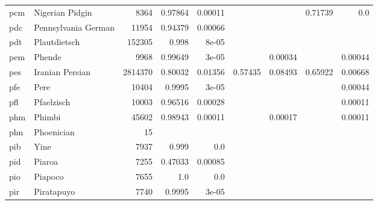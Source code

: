 \documentclass[11pt]{article}
\begin{document}
\begin{table*}[h]
{\begin{tabular}{llrrrrrrr}
pcm         & Nigerian Pidgin         & 8364         & 0.97864         & 0.00011         &          &          & 0.71739         & 0.0         \\

pdc         & Pennsylvania German         & 11954         & 0.94379         & 0.00066         &          &          &          &          \\

pdt         & Plautdietsch         & 152305         & 0.998         & 8e-05         &          &          &          &          \\

pem         & Phende         & 9968         & 0.99649         & 3e-05         &          & 0.00034         &          & 0.00044         \\

pes         & Iranian Persian         & 2814370         & 0.80032         & 0.01356         & 0.57435         & 0.08493         & 0.65922         & 0.00668         \\

pfe         & Pere         & 10404         & 0.9995         & 3e-05         &          &          &          & 0.00044         \\

pfl         & Pfaelzisch         & 10003         & 0.96516         & 0.00028         &          &          &          & 0.00011         \\

phm         & Phimbi         & 45602         & 0.98943         & 0.00011         &          & 0.00017         &          & 0.00011         \\

phn         & Phoenician         & 15         &          &          &          &          &          &          \\

pib         & Yine         & 7937         & 0.999         & 0.0         &          &          &          &          \\

pid         & Piaroa         & 7255         & 0.47033         & 0.00085         &          &          &          &          \\

pio         & Piapoco         & 7655         & 1.0         & 0.0         &          &          &          &          \\

pir         & Piratapuyo         & 7740         & 0.9995         & 3e-05         &          &          &          &          \\


\end{tabular}}
\end{table*}
\end{document}
